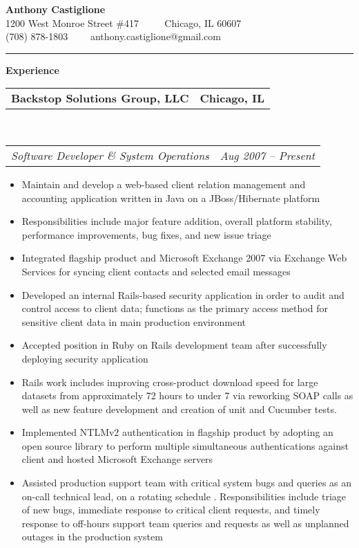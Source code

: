 \documentclass[10pt,letterpaper]{article}
\makeatletter
\newcommand{\headerrow}[2]
{\begin{tabular*}{\linewidth}{l@{\extracolsep{\fill}}r}
	#1 &
	#2 \\
\end{tabular*}}
\newenvironment{indentsection}[1]%
{\begin{list}{}%
	{\setlength{\leftmargin}{#1}}%
	\item[]%
}
{\end{list}}
\makeatother
\begin{document}
\begin{center}
{\LARGE \textbf {Anthony Castiglione}} \\  1200 West Monroe Street \#417 \ \ \textbullet
       \ \ Chicago, IL 60607 \\ (708) 878-1803 \ \ \textbullet \ \ anthony.castiglione@gmail.com
	\end{center}
\hrule
\vspace{0.2in}
{\large \textbf{Experience}}


\begin{indentsection}{\parindent}
	\headerrow
		{\textbf{Backstop Solutions Group, LLC} }
		{\textbf{Chicago, IL}}
	\\
	\headerrow
		{\emph{Software Developer \& System Operations}}
		{\emph{Aug 2007 -- Present}}

	\begin{itemize}
	\renewcommand{\labelitemi}{$-$}
	\vspace{-0.1in}
		\item Maintain and develop a web-based client relation management and accounting application written in Java on a JBoss/Hibernate platform
		\item Responsibilities include major feature addition, overall platform stability, performance improvements, bug fixes, and new issue triage
		\item Integrated flagship product and Microsoft Exchange 2007 via Exchange Web Services for syncing client contacts and selected email messages
		\item Developed an internal Rails-based security application in order to audit and control access to client data; functions as the primary access method for sensitive client data in main production environment
		\item Accepted position in Ruby on Rails development team after successfully deploying security application
    \item Rails work includes improving cross-product download speed for large
datasets from approximately 72 hours to under 7 via reworking SOAP calls as
well as new feature development and creation of unit and Cucumber tests.
		\item Implemented NTLMv2 authentication in flagship product by adopting an open source library to perform multiple simultaneous authentications against client and hosted Microsoft Exchange servers
		\item Assisted production support team with critical system bugs and queries as an on-call technical lead, on a rotating schedule . Responsibilities include triage of new bugs, immediate response to critical client requests, and timely response to off-hours support team queries and requests as well as unplanned outages in the production system
	\end{itemize}
\end{indentsection}
\end{document}
